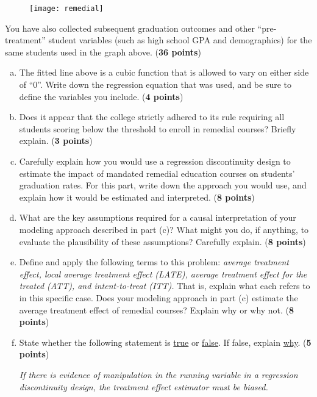 \documentclass[12pt]{article}
\begin{document}
\begin{figure}[h!]
\begin{center}
\texttt{[image: remedial]} 
\end{center}
\end{figure}

You have also collected subsequent graduation outcomes and other ``pre-treatment'' student variables (such as high school GPA and demographics) for the same students used in the graph above. ({\bf 36 points})

\begin{enumerate}[(a)]
\setlength\itemsep{1em}
\item The fitted line above is a cubic function that is allowed to vary on either side of ``0''. Write down the regression equation that was used, and be sure to define the variables you include. ({\bf 4 points})

\item Does it appear that the college strictly adhered to its rule requiring all students scoring below the threshold to enroll in remedial courses? Briefly explain. ({\bf 3 points})

\item Carefully explain how you would use a regression discontinuity design to estimate the impact of mandated remedial education courses on students' graduation rates. For this part, write down the approach you would use, and explain how it would be estimated and interpreted. ({\bf 8 points})

\item What are the key assumptions required for a causal interpretation of your modeling approach described in part (c)? What might you do, if anything, to evaluate the plausibility of these assumptions? Carefully explain. ({\bf 8 points})

\item Define and apply the following terms to this problem: \textit{average treatment effect, local average treatment effect (LATE), average treatment effect for the treated (ATT), and intent-to-treat (ITT).} That is, explain what each refers to in this specific case. Does your modeling approach in part (c) estimate the average treatment effect of remedial courses? Explain why or why not. ({\bf 8 points})

\item State whether the following statement is \underline{true} or \underline{false}. If false, explain \underline{why}. ({\bf 5 points})

\textit{If there is evidence of manipulation in the running variable in a regression discontinuity design, the treatment effect estimator must be biased.} 

\end{enumerate}
\end{document}
